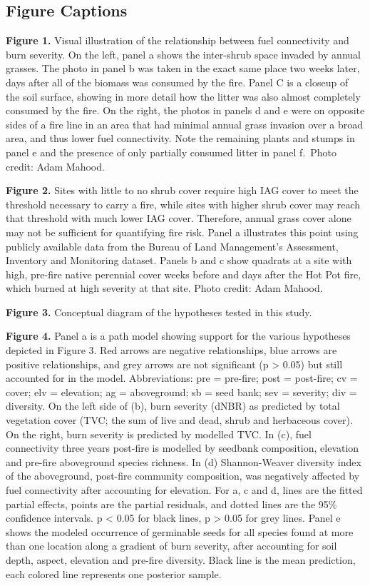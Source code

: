 \documentclass[
  12pt,
]{article}
\begin{document}
\newpage

\hypertarget{figure-captions}{%
\subsection{Figure Captions}\label{figure-captions}}

\textbf{Figure 1.} Visual illustration of the relationship between fuel
connectivity and burn severity. On the left, panel a shows the
inter-shrub space invaded by annual grasses. The photo in panel b was
taken in the exact same place two weeks later, days after all of the
biomass was consumed by the fire. Panel C is a closeup of the soil
surface, showing in more detail how the litter was also almost
completely consumed by the fire. On the right, the photos in panels d
and e were on opposite sides of a fire line in an area that had minimal
annual grass invasion over a broad area, and thus lower fuel
connectivity. Note the remaining plants and stumps in panel e and the
presence of only partially consumed litter in panel f.~Photo credit:
Adam Mahood.

\textbf{Figure 2.} Sites with little to no shrub cover require high IAG
cover to meet the threshold necessary to carry a fire, while sites with
higher shrub cover may reach that threshold with much lower IAG cover.
Therefore, annual grass cover alone may not be sufficient for
quantifying fire risk. Panel a illustrates this point using publicly
available data from the Bureau of Land Management's Assessment,
Inventory and Monitoring dataset. Panels b and c show quadrats at a site
with high, pre-fire native perennial cover weeks before and days after
the Hot Pot fire, which burned at high severity at that site. Photo
credit: Adam Mahood.

\textbf{Figure 3.} Conceptual diagram of the hypotheses tested in this
study.

\textbf{Figure 4.} Panel a is a path model showing support for the
various hypotheses depicted in Figure 3. Red arrows are negative
relationships, blue arrows are positive relationships, and grey arrows
are not significant (p \textgreater{} 0.05) but still accounted for in
the model. Abbreviations: pre = pre-fire; post = post-fire; cv = cover;
elv = elevation; ag = aboveground; sb = seed bank; sev = severity; div =
diversity. On the left side of (b), burn severity (dNBR) as predicted by
total vegetation cover (TVC; the sum of live and dead, shrub and
herbaceous cover). On the right, burn severity is predicted by modelled
TVC. In (c), fuel connectivity three years post-fire is modelled by
seedbank composition, elevation and pre-fire aboveground species
richness. In (d) Shannon-Weaver diversity index of the aboveground,
post-fire community composition, was negatively affected by fuel
connectivity after accounting for elevation. For a, c and d, lines are
the fitted partial effects, points are the partial residuals, and dotted
lines are the 95\% confidence intervals. p \textless{} 0.05 for black
lines, p \textgreater{} 0.05 for grey lines. Panel e shows the modeled
occurrence of germinable seeds for all species found at more than one
location along a gradient of burn severity, after accounting for soil
depth, aspect, elevation and pre-fire diversity. Black line is the mean
prediction, each colored line represents one posterior sample.
\end{document}
